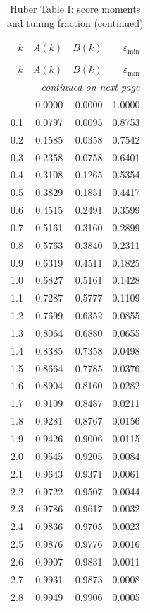 \begin{center}\small
\begin{longtable}{rrrr}
\caption{Huber Table I: score moments and tuning fraction}
\label{tab:p15-huber-table-one-moments}\\
\(k\)&\(A(k)\)&\(B(k)\)&\(\varepsilon_{\min}\)\\\hline
\endfirsthead
\caption[]{Huber Table I: score moments and tuning fraction (continued)}\\
\(k\)&\(A(k)\)&\(B(k)\)&\(\varepsilon_{\min}\)\\\hline
\endhead
\hline\multicolumn{4}{r}{\emph{continued on next page}}\\
\endfoot
\endlastfoot
0.0&0.0000&0.0000&1.0000\\
0.1&0.0797&0.0095&0.8753\\
0.2&0.1585&0.0358&0.7542\\
0.3&0.2358&0.0758&0.6401\\
0.4&0.3108&0.1265&0.5354\\
0.5&0.3829&0.1851&0.4417\\
0.6&0.4515&0.2491&0.3599\\
0.7&0.5161&0.3160&0.2899\\
0.8&0.5763&0.3840&0.2311\\
0.9&0.6319&0.4511&0.1825\\
1.0&0.6827&0.5161&0.1428\\
1.1&0.7287&0.5777&0.1109\\
1.2&0.7699&0.6352&0.0855\\
1.3&0.8064&0.6880&0.0655\\
1.4&0.8385&0.7358&0.0498\\
1.5&0.8664&0.7785&0.0376\\
1.6&0.8904&0.8160&0.0282\\
1.7&0.9109&0.8487&0.0211\\
1.8&0.9281&0.8767&0.0156\\
1.9&0.9426&0.9006&0.0115\\
2.0&0.9545&0.9205&0.0084\\
2.1&0.9643&0.9371&0.0061\\
2.2&0.9722&0.9507&0.0044\\
2.3&0.9786&0.9617&0.0032\\
2.4&0.9836&0.9705&0.0023\\
2.5&0.9876&0.9776&0.0016\\
2.6&0.9907&0.9831&0.0011\\
2.7&0.9931&0.9873&0.0008\\
2.8&0.9949&0.9906&0.0005\\

\end{longtable}
\end{center}
